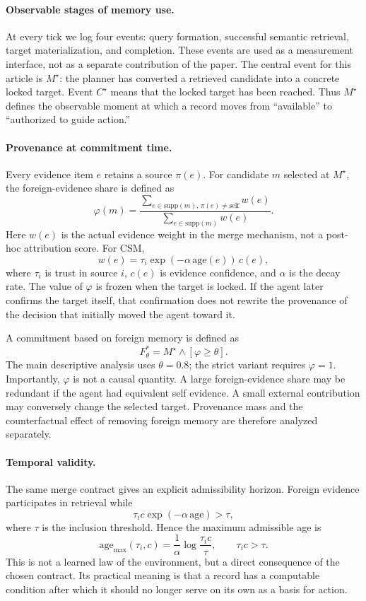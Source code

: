 \documentclass{article}
\newcommand{\mstar}{M^{\star}}
\newcommand{\cstar}{C^{\star}}
\begin{document}
\paragraph{Observable stages of memory use.}
At every tick we log four events: query formation, successful semantic retrieval, target materialization, and completion. These events are used as a measurement interface, not as a separate contribution of the paper. The central event for this article is $\mstar$: the planner has converted a retrieved candidate into a concrete locked target. Event $\cstar$ means that the locked target has been reached. Thus $\mstar$ defines the observable moment at which a record moves from ``available'' to ``authorized to guide action.''

\paragraph{Provenance at commitment time.}
Every evidence item $e$ retains a source $\pi(e)$. For candidate $m$ selected at $\mstar$, the foreign-evidence share is defined as
\begin{equation}
\varphi(m)=
\frac{\sum_{e\in \mathrm{supp}(m),\,\pi(e)\neq\mathrm{self}} w(e)}
{\sum_{e\in \mathrm{supp}(m)} w(e)} .
\label{eq:phi}
\end{equation}
Here $w(e)$ is the actual evidence weight in the merge mechanism, not a post-hoc attribution score. For CSM,
\[
w(e)=\tau_i \exp(-\alpha\,\mathrm{age}(e))\,c(e),
\]
where $\tau_i$ is trust in source $i$, $c(e)$ is evidence confidence, and $\alpha$ is the decay rate. The value of $\varphi$ is frozen when the target is locked. If the agent later confirms the target itself, that confirmation does not rewrite the provenance of the decision that initially moved the agent toward it.

A commitment based on foreign memory is defined as
\[
F^*_{\theta}=\mstar \wedge [\varphi\geq\theta].
\]
The main descriptive analysis uses $\theta=0.8$; the strict variant requires $\varphi=1$. Importantly, $\varphi$ is not a causal quantity. A large foreign-evidence share may be redundant if the agent had equivalent self evidence. A small external contribution may conversely change the selected target. Provenance mass and the counterfactual effect of removing foreign memory are therefore analyzed separately.

\paragraph{Temporal validity.}
The same merge contract gives an explicit admissibility horizon. Foreign evidence participates in retrieval while
\[
\tau_i c \exp(-\alpha\,\mathrm{age})>\tau ,
\]
where $\tau$ is the inclusion threshold. Hence the maximum admissible age is
\begin{equation}
\mathrm{age}_{\max}(\tau_i,c)=\frac{1}{\alpha}\log\frac{\tau_i c}{\tau},
\qquad \tau_i c>\tau .
\label{eq:horizon}
\end{equation}
This is not a learned law of the environment, but a direct consequence of the chosen contract. Its practical meaning is that a record has a computable condition after which it should no longer serve on its own as a basis for action.
\end{document}
